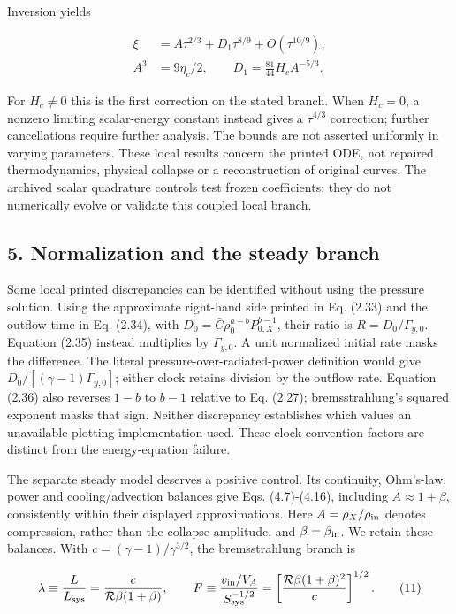 Inversion yields

\[
\begin{aligned}
\xi&=A\tau^{2/3}+D_1\tau^{8/9}+O(\tau^{10/9}),\\
A^3&=9\eta_c/2,\qquad D_1=\frac{81}{44}H_cA^{-5/3}.
\end{aligned}\tag{10}
\]

For \(H_c\ne0\) this is the first correction on the stated branch. When
\(H_c=0\), a nonzero limiting scalar-energy constant instead gives a
\(\tau^{4/3}\) correction; further cancellations require further
analysis. The bounds are not asserted uniformly in varying parameters.
These local results concern the printed ODE, not repaired
thermodynamics, physical collapse or a reconstruction of original
curves. The archived scalar quadrature controls test frozen
coefficients; they do not numerically evolve or validate this coupled
local branch.

\subsection{5. Normalization and the steady
branch}\label{normalization-and-the-steady-branch}

Some local printed discrepancies can be identified without using the
pressure solution. Using the approximate right-hand side printed in Eq.
(2.33) and the outflow time in Eq. (2.34), with
\(D_0=\bar C\rho_0^{a-b}P_{0,X}^{b-1}\), their ratio is
\(R=D_0/\Gamma_{y,0}\). Equation (2.35) instead multiplies by
\(\Gamma_{y,0}\). A unit normalized initial rate masks the difference.
The literal pressure-over-radiated-power definition would give
\(D_0/[(\gamma-1)\Gamma_{y,0}]\); either clock retains division by the
outflow rate. Equation (2.36) also reverses \(1-b\) to \(b-1\) relative
to Eq. (2.27); bremsstrahlung's squared exponent masks that sign.
Neither discrepancy establishes which values an unavailable plotting
implementation used. These clock-convention factors are distinct from
the energy-equation failure.

The separate steady model deserves a positive control. Its continuity,
Ohm's-law, power and cooling/advection balances give Eqs. (4.7)-(4.16),
including \(A\approx1+\beta\), consistently within their displayed
approximations. Here \(A=\rho_X/\rho_{\rm in}\) denotes compression,
rather than the collapse amplitude, and \(\beta=\beta_{\rm in}\). We
retain these balances. With \(c=(\gamma-1)/\gamma^{3/2}\), the
bremsstrahlung branch is

\[
\lambda\equiv\frac{L}{L_{\rm sys}}
=\frac{c}{\mathcal R\beta(1+\beta)},\qquad
F\equiv\frac{v_{\rm in}/V_A}{S_{\rm sys}^{-1/2}}
=\left[\frac{\mathcal R\beta(1+\beta)^2}{c}\right]^{1/2}. \tag{11}
\]

